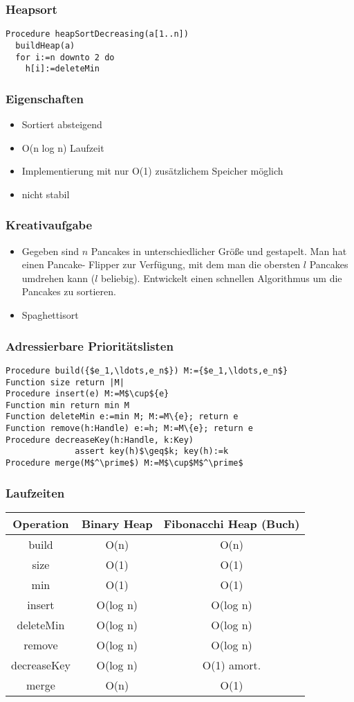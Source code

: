 \begin{frame}[fragile]
\frametitle{Heapsort}
\begin{lstlisting}
Procedure heapSortDecreasing(a[1..n])
  buildHeap(a)
  for i:=n downto 2 do
    h[i]:=deleteMin
\end{lstlisting}
\end{frame}

\begin{frame}
\frametitle{Eigenschaften}
\begin{itemize}
\item Sortiert absteigend\pause
\item O(n log n) Laufzeit
\item Implementierung mit nur O(1) zusätzlichem Speicher möglich\pause
\item nicht stabil
\end{itemize}
\end{frame}

\begin{frame}
\frametitle{Kreativaufgabe}
\begin{itemize}
\item Gegeben sind $n$ Pancakes in unterschiedlicher Größe und gestapelt. Man hat einen Pancake-
Flipper zur Verfügung, mit dem man die obersten $l$ Pancakes umdrehen kann ($l$ beliebig).
Entwickelt einen schnellen Algorithmus um die Pancakes zu sortieren.\pause
\item Spaghettisort
\end{itemize}
\end{frame}

\begin{frame}[fragile]
\frametitle{Adressierbare Prioritätslisten}
\begin{lstlisting}
Procedure build({$e_1,\ldots,e_n$}) M:={$e_1,\ldots,e_n$}
Function size return |M|
Procedure insert(e) M:=M$\cup${e}
Function min return min M
Function deleteMin e:=min M; M:=M\{e}; return e
Function remove(h:Handle) e:=h; M:=M\{e}; return e
Procedure decreaseKey(h:Handle, k:Key)
              assert key(h)$\geq$k; key(h):=k
Procedure merge(M$^\prime$) M:=M$\cup$M$^\prime$
\end{lstlisting}
\end{frame}

\begin{frame}
\frametitle{Laufzeiten}
\begin{tabular}{c|c|c}
Operation & Binary Heap & Fibonacchi Heap (Buch) \\ \hline
build & O(n) & O(n) \\
size & O(1) & O(1) \\
min & O(1) & O(1) \\
insert & O(log n) & O(log n) \\
deleteMin & O(log n) & O(log n) \\
remove & O(log n) & O(log n) \\
decreaseKey & O(log n) & O(1) amort. \\
merge & O(n) & O(1)
\end{tabular}
\end{frame}
